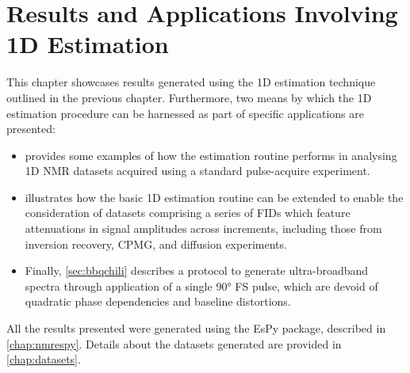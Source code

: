 \chapter{Results and Applications Involving 1D Estimation}
\label{chap:results}

This chapter showcases results generated using the \ac{1D} estimation
technique outlined in the previous chapter. Furthermore, two means by
which the \ac{1D} estimation procedure can be harnessed as part of
specific applications are presented:
\begin{itemize}
    \item {} provides some examples of how the estimation
        routine performs in analysing \ac{1D} \ac{NMR} datasets acquired using
        a standard pulse-acquire experiment.
    \item {} illustrates how the basic \ac{1D} estimation routine can be
        extended to enable the consideration of datasets comprising a series of
        \acp{FID} which feature attenuations in signal amplitudes across increments,
        including those from inversion recovery, \ac{CPMG}, and diffusion experiments.
    \item Finally,
        \cref{sec:bbqchili} describes a protocol to generate ultra-broadband spectra
        through application of a single \ang{90} \acl{FS} pulse, which are devoid of
        quadratic phase dependencies and baseline distortions.
\end{itemize}

All the results presented were generated using the \ac{EsPy} package,
described in \cref{chap:nmrespy}. Details about the datasets generated are
provided in \cref{chap:datasets}.





